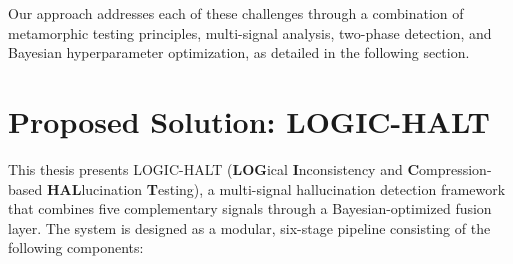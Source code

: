 Our approach addresses each of these challenges through a combination of metamorphic testing principles, multi-signal analysis, two-phase detection, and Bayesian hyperparameter optimization, as detailed in the following section.

\section{Proposed Solution: LOGIC-HALT}

This thesis presents LOGIC-HALT (\textbf{LOG}ical \textbf{I}nconsistency and \textbf{C}ompression-based \textbf{HAL}lucination \textbf{T}esting), a multi-signal hallucination detection framework that combines five complementary signals through a Bayesian-optimized fusion layer. The system is designed as a modular, six-stage pipeline consisting of the following components:


